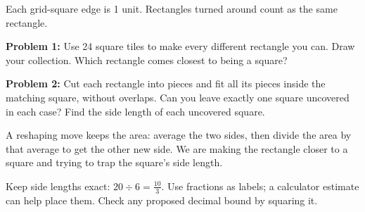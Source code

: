 \documentclass[12pt]{article}
\newcommand{\problem}[2]{\par\textbf{Problem #1:} #2\par}
\newcommand{\unitrect}[5]{%
  \begin{scope}[shift={(#1,#2)}]
  \draw[step=1,gray!45,very thin] (0,0) grid (#3,#4);
  \draw[thick] (0,0) rectangle (#3,#4);
  \node[below] at (#3/2,0) {#3};
  \node[left] at (0,#4/2) {#4};
  \node[above] at (#3/2,#4) {#5};
  \end{scope}}
\begin{document}
Each grid-square edge is 1 unit. Rectangles turned around count as the same rectangle.

\problem{1}{Use 24 square tiles to make every different rectangle you can. Draw your collection. Which rectangle comes closest to being a square?}
\vspace{3mm}
\begin{center}
\end{center}
\vfill
\newpage
\problem{2}{Cut each rectangle into pieces and fit all its pieces inside the matching square, without overlaps. Can you leave exactly one square uncovered in each case? Find the side length of each uncovered square.}
\begin{center}
\end{center}
\vfill
\newpage
A reshaping move keeps the area: average the two sides, then divide the area by that average to get the other new side. We are making the rectangle closer to a square and trying to trap the square's side length.

\begin{center}
\end{center}

Keep side lengths exact: $20\div6=\frac{10}{3}$. Use fractions as labels; a calculator estimate can help place them. Check any proposed decimal bound by squaring it.
\end{document}
